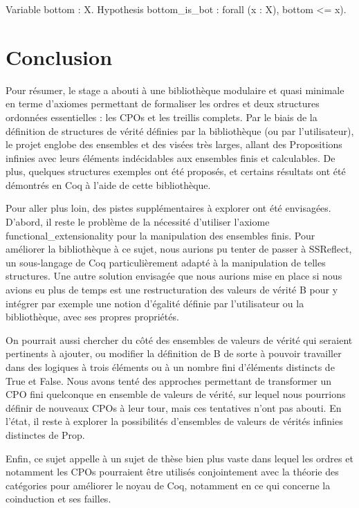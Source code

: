 \documentclass{article}
\newcommand\code[1]{{\fontfamily{lmtt}\selectfont #1}}
\theoremstyle{definition}
\begin{document}
\begin{coq}
 Variable bottom : X.
 Hypothesis bottom_is_bot : forall (x : X), bottom <= x).
\end{coq}




\section*{Conclusion}

Pour résumer, le stage a abouti à une bibliothèque modulaire et quasi minimale en terme d'axiomes permettant de formaliser les ordres et deux structures ordonnées essentielles : les CPOs et les treillis complets. Par le biais de la définition de structures de vérité définies par la bibliothèque (ou par l'utilisateur), le projet englobe des ensembles et des visées très larges, allant des Propositions infinies avec leurs éléments indécidables aux ensembles finis et calculables. De plus, quelques structures exemples ont été proposés, et certains résultats ont été démontrés en Coq à l'aide de cette bibliothèque.

\medskip

Pour aller plus loin, des pistes supplémentaires à explorer ont été envisagées. D'abord, il reste le problème de la nécessité d'utiliser l'axiome \code{functional\_extensionality} pour la manipulation des ensembles finis. Pour améliorer la bibliothèque à ce sujet, nous aurions pu tenter de passer à SSReflect, un sous-langage de Coq particulièrement adapté à la manipulation de telles structures. Une autre solution envisagée que nous aurions mise en place si nous avions eu plus de temps est une restructuration des valeurs de vérité \code{B} pour y intégrer par exemple une notion d'égalité définie par l'utilisateur ou la bibliothèque, avec ses propres propriétés.

On pourrait aussi chercher du côté des ensembles de valeurs de vérité qui seraient pertinents à ajouter, ou modifier la définition de \code{B} de sorte à pouvoir travailler dans des logiques à trois éléments ou à un nombre fini d'éléments distincts de \code{True} et \code{False}. Nous avons tenté des approches permettant de transformer un CPO fini quelconque en ensemble de valeurs de vérité, sur lequel nous pourrions définir de nouveaux CPOs à leur tour, mais ces tentatives n'ont pas abouti. En l'état, il reste à explorer la possibilités d'ensembles de valeurs de vérités infinies distinctes de \code{Prop}.

Enfin, ce sujet appelle à un sujet de thèse bien plus vaste dans lequel les ordres et notamment les CPOs pourraient être utilisés conjointement avec la théorie des catégories pour améliorer le noyau de Coq, notamment en ce qui concerne la coinduction et ses failles.
\end{document}
